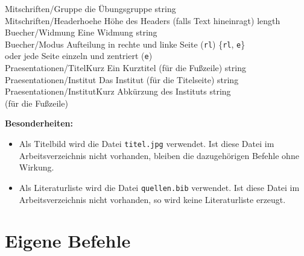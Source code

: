 \begin{tabbing}
				Mitschriften/Gruppe 			\> \zb die Übungsgruppe					\> string			\\
				Mitschriften/Headerhoehe		\> Höhe des Headers (falls Text hineinragt)
																						\> length			\\
				Buecher/Widmung					\> Eine Widmung							\> string			\\
				Buecher/Modus					\> Aufteilung in rechte und linke Seite (\texttt{rl})
																						\> \{\texttt{rl}, \texttt{e}\} \\
												\> oder jede Seite einzeln und zentriert (\texttt{e})					\\
				Praesentationen/TitelKurz		\> Ein Kurztitel (für die Fußzeile)		\> string			\\
				Praesentationen/Institut		\> Das Institut (für die Titelseite)	\> string			\\
				Praesentationen/InstitutKurz	\> Abkürzung des Instituts 				\> string 			\\
												\> (für die Fußzeile)
			\end{tabbing}
			\textbf{Besonderheiten:}
			\begin{itemize}
				\item Als Titelbild wird die Datei \texttt{titel.jpg} verwendet. Ist diese Datei im Arbeitsverzeichnis nicht vorhanden, bleiben die dazugehörigen Befehle ohne Wirkung.
				\item Als Literaturliste wird die Datei \texttt{quellen.bib} verwendet. Ist diese Datei im Arbeitsverzeichnis nicht vorhanden, so wird keine Literaturliste erzeugt.
			\end{itemize}


	

	\chapter{Eigene Befehle}

